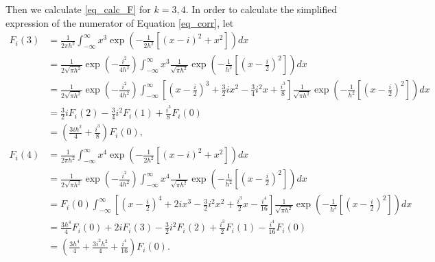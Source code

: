 \documentclass{article}
\begin{document}
\begin{appendices}
	Then we calculate \eqref{eq_calc_F} for $k=3,4$.
	In order to calculate the simplified expression of the numerator of Equation \ref{eq_corr}, let
	\begin{equation*}
		\begin{aligned}
			F_{i}(3)&=\frac{1}{2\pi h^2}\int_{-\infty}^{\infty}x^3\exp(-\frac{1}{2h^2}[(x-i)^2+x^2])dx\\
			&=\frac{1}{2\sqrt{\pi h^2}}\exp(-\frac{i^2}{4h^2})\int_{-\infty}^{\infty}x^3\frac{1}{\sqrt{\pi h^2}}\exp(-\frac{1}{h^2}[(x-\frac{i}{2})^2])dx\\
			&=\frac{1}{2\sqrt{\pi h^2}}\exp(-\frac{i^2}{4h^2})\int_{-\infty}^{\infty}[(x-\frac{i}{2})^3+\frac{3}{2}ix^2-\frac{3}{4}i^2x+\frac{i^3}{8}]\frac{1}{\sqrt{\pi h^2}}\exp(-\frac{1}{h^2}[(x-\frac{i}{2})^2])dx\\
			&=\frac{3}{2}iF_{i}(2)-\frac{3}{4}i^2F_{i}(1)+\frac{i^3}{8}F_{i}(0)\\
			&=(\frac{3ih^2}{4}+\frac{i^3}{8})F_{i}(0),
		\end{aligned}
	\end{equation*}
	\begin{equation*}
		\begin{aligned}
			F_{i}(4)&=\frac{1}{2\pi h^2}\int_{-\infty}^{\infty}x^4\exp(-\frac{1}{2h^2}[(x-i)^2+x^2])dx\\
			&=\frac{1}{2\sqrt{\pi h^2}}\exp(-\frac{i^2}{4h^2})\int_{-\infty}^{\infty}x^4\frac{1}{\sqrt{\pi h^2}}\exp(-\frac{1}{h^2}[(x-\frac{i}{2})^2])dx\\
			&=F_{i}(0)\int_{-\infty}^{\infty}[(x-\frac{i}{2})^4+2ix^3-\frac{3}{2}i^2x^2+\frac{i^3}{2}x-\frac{i^4}{16}]\frac{1}{\sqrt{\pi h^2}}\exp(-\frac{1}{h^2}[(x-\frac{i}{2})^2])dx\\
			&=\frac{3h^4}{4}F_{i}(0)+2iF_{i}(3)-\frac{3}{2}i^2F_{i}(2)+\frac{i^3}{2}F_{i}(1)-\frac{i^4}{16}F_{i}(0)\\
			&=(\frac{3h^4}{4}+\frac{3i^2h^2}{4}+\frac{i^4}{16})F_{i}(0).
		\end{aligned}
	\end{equation*}
	

\end{appendices}
\end{document}
